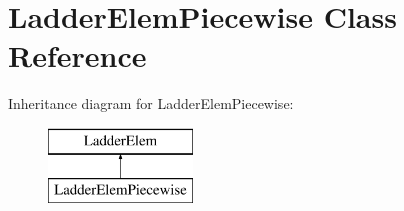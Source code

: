 \hypertarget{class_ladder_elem_piecewise}{\section{Ladder\-Elem\-Piecewise Class Reference}
\label{class_ladder_elem_piecewise}
}
Inheritance diagram for Ladder\-Elem\-Piecewise\-:\begin{figure}[H]
\begin{center}
\leavevmode
\includegraphics[height=2.000000cm]{class_ladder_elem_piecewise}
\end{center}
\end{figure}

